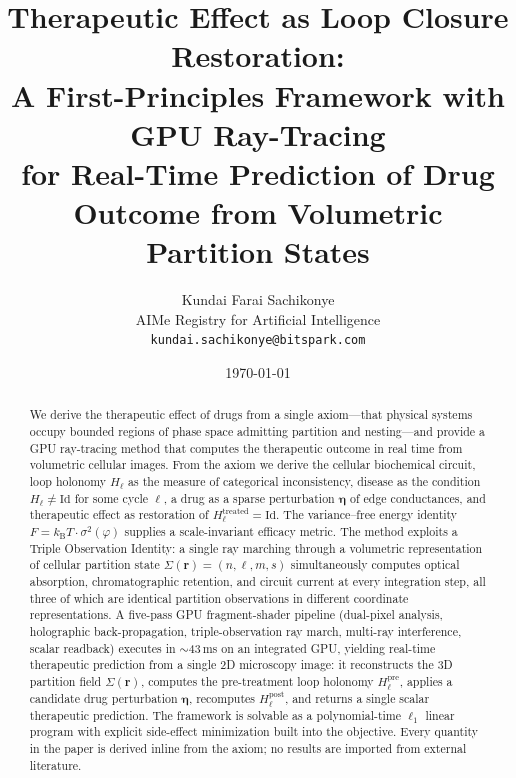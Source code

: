 \documentclass[twocolumn,10pt,a4paper]{article}
\theoremstyle{definition}
\theoremstyle{remark}
\newcommand{\kB}{k_{\mathrm{B}}}
\begin{document}
\title{\textbf{Therapeutic Effect as Loop Closure Restoration:\\
A First-Principles Framework with GPU Ray-Tracing\\
for Real-Time Prediction of Drug Outcome from Volumetric Partition States}}

\author{
Kundai Farai Sachikonye\\
AIMe Registry for Artificial Intelligence\\
\texttt{kundai.sachikonye@bitspark.com}
}

\date{\today}
\maketitle

\begin{abstract}
\noindent We derive the therapeutic effect of drugs from a single axiom---that physical systems occupy bounded regions of phase space admitting partition and nesting---and provide a GPU ray-tracing method that computes the therapeutic outcome in real time from volumetric cellular images. From the axiom we derive the cellular biochemical circuit, loop holonomy $H_\ell$ as the measure of categorical inconsistency, disease as the condition $H_\ell \neq \mathrm{Id}$ for some cycle $\ell$, a drug as a sparse perturbation $\boldsymbol{\eta}$ of edge conductances, and therapeutic effect as restoration of $H_\ell^{\mathrm{treated}} = \mathrm{Id}$. The variance--free energy identity $F = \kB T \cdot \sigma^2(\varphi)$ supplies a scale-invariant efficacy metric. The method exploits a Triple Observation Identity: a single ray marching through a volumetric representation of cellular partition state $\Sigma(\mathbf{r}) = (n,\ell,m,s)$ simultaneously computes optical absorption, chromatographic retention, and circuit current at every integration step, all three of which are identical partition observations in different coordinate representations. A five-pass GPU fragment-shader pipeline (dual-pixel analysis, holographic back-propagation, triple-observation ray march, multi-ray interference, scalar readback) executes in $\sim$43\,ms on an integrated GPU, yielding real-time therapeutic prediction from a single 2D microscopy image: it reconstructs the 3D partition field $\Sigma(\mathbf{r})$, computes the pre-treatment loop holonomy $H_\ell^{\mathrm{pre}}$, applies a candidate drug perturbation $\boldsymbol{\eta}$, recomputes $H_\ell^{\mathrm{post}}$, and returns a single scalar therapeutic prediction. The framework is solvable as a polynomial-time $\ell_1$ linear program with explicit side-effect minimization built into the objective. Every quantity in the paper is derived inline from the axiom; no results are imported from external literature.
\end{abstract}
\end{document}
